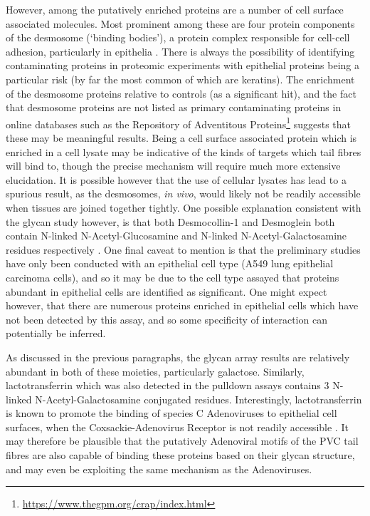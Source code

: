 However, among the putatively enriched proteins are a number of cell surface associated molecules. Most prominent among these are four protein components of the desmosome (`binding bodies'), a protein complex responsible for cell-cell adhesion, particularly in epithelia \citep{Delva2009}. There is always the possibility of identifying contaminating proteins in proteomic experiments with epithelial proteins being a particular risk (by far the most common of which are keratins). The enrichment of the desmosome proteins relative to controls (as a significant hit), and the fact that desmosome proteins are not listed as primary contaminating proteins in online databases such as the Repository of Adventitous Proteins\footnote{\url{https://www.thegpm.org/crap/index.html}} suggests that these may be meaningful results. Being a cell surface associated protein which is enriched in a cell lysate may be indicative of the kinds of targets which tail fibres will bind to, though the precise mechanism will require much more extensive elucidation. It is possible however that the use of cellular lysates has lead to a spurious result, as the desmosomes, \emph{in vivo}, would likely not be readily accessible when tissues are joined together tightly. One possible explanation consistent with the glycan study however, is that both Desmocollin-1 and Desmoglein both contain N-linked N-Acetyl-Glucosamine and N-linked N-Acetyl-Galactosamine residues respectively \citep{Ramachandran2006}. One final caveat to mention is that the preliminary studies have only been conducted with an epithelial cell type (A549 lung epithelial carcinoma cells), and so it may be due to the cell type assayed that proteins abundant in epithelial cells are identified as significant. One might expect however, that there are numerous proteins enriched in epithelial cells which have not been detected by this assay, and so some specificity of interaction can potentially be inferred.

As discussed in the previous paragraphs, the glycan array results are relatively abundant in both of these moieties, particularly galactose. Similarly, lactotransferrin which was also detected in the pulldown assays contains 3 N-linked N-Acetyl-Galactosamine conjugated residues. Interestingly, lactotransferrin is known to promote the binding of species C Adenoviruses to epithelial cell surfaces, when the Coxsackie-Adenovirus Receptor is not readily accessible \citep{Johansson2007}. It may therefore be plausible that the putatively Adenoviral motifs of the PVC tail fibres are also capable of binding these proteins based on their glycan structure, and may even be exploiting the same mechanism as the Adenoviruses.



